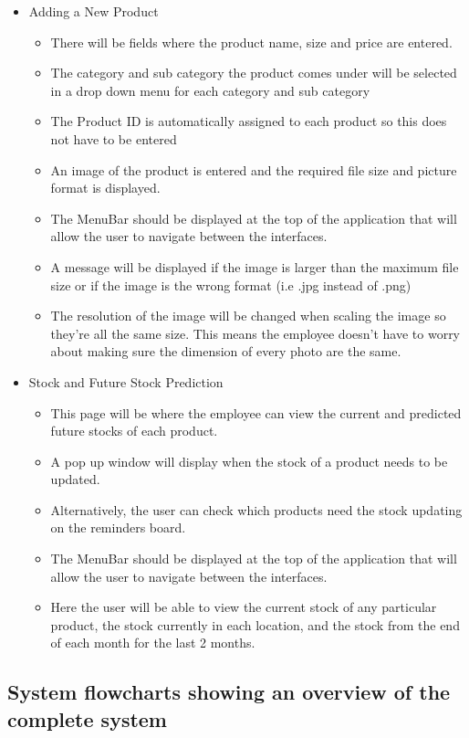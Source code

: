 \begin{itemize}
	\item{Adding a New Product}
	\begin{itemize}
		\item There will be fields where the product name, size and price are entered.
		\item The category and sub category the product comes under will be selected in a drop down menu for each category and sub category
		\item The Product ID is automatically assigned to each product so this does not have to be entered
		\item An image of the product is entered and the required file size and picture format is displayed.
		\item The MenuBar should be displayed at the top of the application that will allow the user to navigate between the interfaces.
		\item A message will be displayed if the image is larger than the maximum file size or if the image is the wrong format (i.e .jpg instead of .png)
		\item The resolution of the image will be changed when scaling the image so they're all the same size. This means the employee doesn't have to worry about making sure the dimension of every photo are the same.
	\end{itemize}

	\item Stock and Future Stock Prediction
	\begin{itemize}
		\item This page will be where the employee can view the current and predicted future stocks of each product.
		\item A pop up window will display when the stock of a product needs to be updated.
		\item Alternatively, the user can check which products need the stock updating on the reminders board.
		\item The MenuBar should be displayed at the top of the application that will allow the user to navigate between the interfaces.
		\item Here the user will be able to view the current stock of any particular product, the stock currently in each location, and the stock from the end of each month for the last 2 months.
	\end{itemize}
\end{itemize}

\subsection{System flowcharts showing an overview of the complete system}

